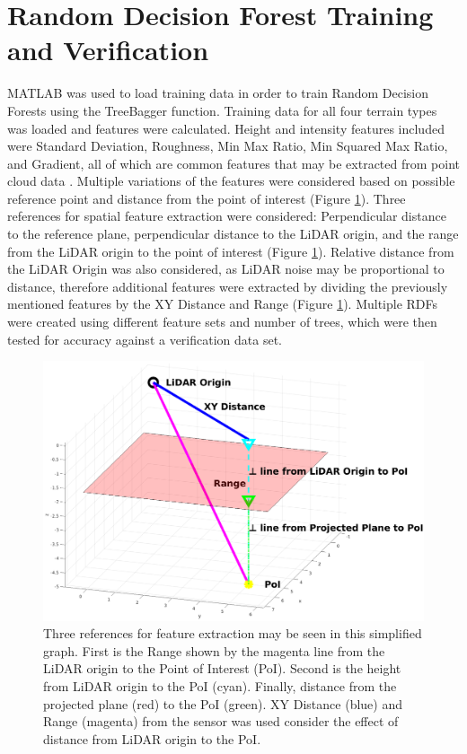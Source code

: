 \documentclass[numbered,pdftex]{ohio-etd}
\begin{document}
{{	} %
		
	
	\section{Random Decision Forest Training and Verification}
	
		{MATLAB was used to load training data in order to train Random Decision Forests using the TreeBagger function. Training data for all four terrain types was loaded and features were calculated. Height and intensity features included were Standard Deviation, Roughness, Min Max Ratio, Min Squared Max Ratio, and Gradient, all of which are common features that may be extracted from point cloud data \cite{breiman_random_2001}. Multiple variations of the features were considered based on possible reference point and distance from the point of interest (Figure \ref{fig:xy_vs_range}). Three references for spatial feature extraction were considered: Perpendicular distance to the reference plane, perpendicular distance to the LiDAR origin, and the range from the LiDAR origin to the point of interest (Figure \ref{fig:xy_vs_range}). Relative distance from the LiDAR Origin was also considered, as LiDAR noise may be proportional to distance, therefore additional features were extracted by dividing the previously mentioned features by the XY Distance and Range (Figure \ref{fig:xy_vs_range}). Multiple RDFs were created using different feature sets and number of trees, which were then tested for accuracy against a verification data set.} 
	
		\begin{figure}[H]
			\centering
			\includegraphics[width=1\linewidth]{Defense_Images/xy_vs_range}
			\caption[XY vs Range vs Z Height]{Three references for feature extraction may be seen in this simplified graph. First is the Range shown by the magenta line from the LiDAR origin to the Point of Interest (PoI). Second is the height from  LiDAR origin to the PoI (cyan). Finally, distance from the projected plane (red) to the PoI (green). XY Distance (blue) and Range (magenta) from the sensor was used consider the effect of distance from LiDAR origin to the PoI.}
			\label{fig:xy_vs_range}
		\end{figure}
	
}
\end{document}
